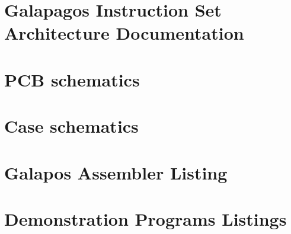 \appendix
\chapter{Galapagos Instruction Set Architecture Documentation} \label{appendix:isa}


\chapter{PCB schematics} \label{appendix:pcb-schematics}

\chapter{Case schematics} \label{appendix:case-schematics}

\chapter{Galapos Assembler Listing} \label{appendix:galapagos-assembler-source}







\chapter{Demonstration Programs Listings} \label{appendix:demonstration-programs-source-code}
